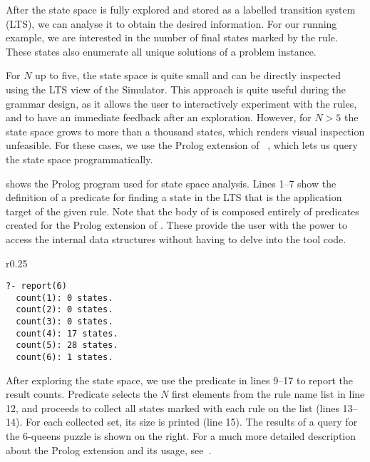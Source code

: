 After the state space is fully explored and stored as a labelled transition
system (LTS), we can analyse it to obtain the desired information. For our
running example, we are interested in the number of final states marked by the
 rule. These states also enumerate all unique solutions of a
problem instance.

For $N$ up to five, the state space is quite small and can be directly inspected
using the LTS view of the Simulator. This approach is quite useful during
the grammar design, as it allows the user to interactively experiment with the
rules, and to have an immediate feedback after an exploration. However, for
$N > 5$ the state space grows to more than a thousand states, which renders
visual inspection unfeasible. For these cases, we use the Prolog extension of
\GROOVE~\cite{GZR+11}, which lets us query the state space programmatically.



 shows the Prolog program used for state space analysis. Lines
1--7 show the definition of a predicate for finding a state in the LTS that is
the application target of the given rule. Note that the body of
 is composed entirely of predicates created
for the Prolog extension of \GROOVE. These provide the user with the power to
access the internal \GROOVE data structures without having to delve into the
tool code.

\begin{wrapfigure}[7]{r}{0.25\linewidth}
\vspace{-10pt}
\begin{lstlisting}[style=prolog, numbers=none]
?- report(6)
  count(1): 0 states.
  count(2): 0 states.
  count(3): 0 states.
  count(4): 17 states.
  count(5): 28 states.
  count(6): 1 states.
\end{lstlisting}
\end{wrapfigure}

After exploring the state space, we use the predicate in lines 9--17 to report
the result counts. Predicate  selects the $N$ first elements
from the rule name list in line 12, and proceeds to collect all states marked
with each rule on the list (lines 13--14). For each collected set, its size is
printed (line 15). The results of a query for the 6-queens puzzle is shown on
the right. For a much more detailed description about the Prolog extension and
its usage, see~\cite{GZR+11}.


